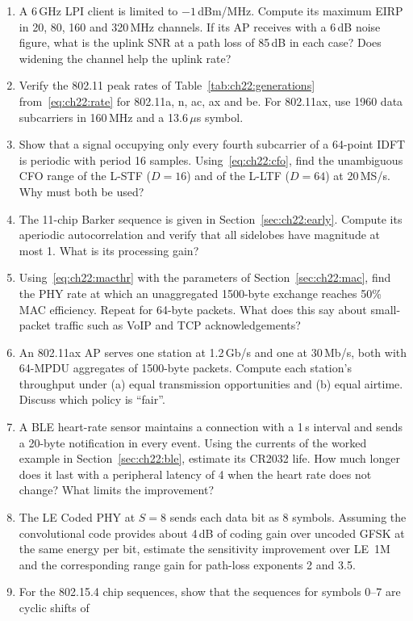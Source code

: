 \problems
\begin{enumerate}[label=\thechapter.\arabic*]
\item A 6\,GHz LPI client is limited to $-1$\,dBm/MHz. Compute its maximum EIRP in 20, 80, 160 and
320\,MHz channels. If its AP receives with a 6\,dB noise figure, what is the uplink SNR at a path loss
of 85\,dB in each case? Does widening the channel help the uplink rate?
\item Verify the 802.11 peak rates of Table~\ref{tab:ch22:generations} from~\eqref{eq:ch22:rate} for
802.11a, n, ac, ax and be. For 802.11ax, use 1960 data subcarriers in 160\,MHz and a 13.6\,$\mu$s
symbol.
\item Show that a signal occupying only every fourth subcarrier of a 64-point IDFT is periodic with
period 16 samples. Using~\eqref{eq:ch22:cfo}, find the unambiguous CFO range of the L-STF ($D=16$) and
of the L-LTF ($D=64$) at 20\,MS/s. Why must both be used?
\item The 11-chip Barker sequence is given in Section~\ref{sec:ch22:early}. Compute its aperiodic
autocorrelation and verify that all sidelobes have magnitude at most 1. What is its processing gain?
\item Using~\eqref{eq:ch22:macthr} with the parameters of Section~\ref{sec:ch22:mac}, find the PHY rate
at which an unaggregated 1500-byte exchange reaches 50\% MAC efficiency. Repeat for 64-byte packets.
What does this say about small-packet traffic such as VoIP and TCP acknowledgements?
\item An 802.11ax AP serves one station at 1.2\,Gb/s and one at 30\,Mb/s, both with 64-MPDU aggregates
of 1500-byte packets. Compute each station's throughput under (a) equal transmission opportunities
and (b) equal airtime. Discuss which policy is ``fair''.
\item A BLE heart-rate sensor maintains a connection with a 1\,s interval and sends a 20-byte
notification in every event. Using the currents of the worked example in Section~\ref{sec:ch22:ble},
estimate its CR2032 life. How much longer does it last with a peripheral latency of 4 when the heart
rate does not change? What limits the improvement?
\item The LE Coded PHY at $S=8$ sends each data bit as 8 symbols. Assuming the convolutional code
provides about 4\,dB of coding gain over uncoded GFSK at the same energy per bit, estimate the
sensitivity improvement over LE~1M and the corresponding range gain for path-loss exponents 2 and 3.5.
\item For the 802.15.4 chip sequences, show that the sequences for symbols 0--7 are cyclic shifts of

\end{enumerate}
